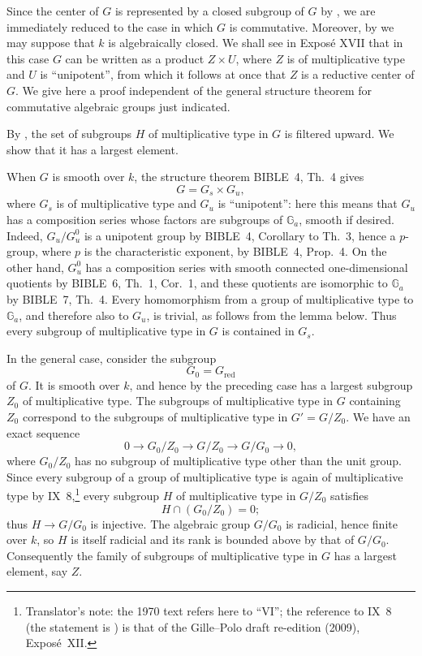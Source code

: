 Since the center of \(G\) is represented by a closed subgroup of
\(G\) by , we are immediately reduced to the case in which
\(G\) is commutative. Moreover, by  we may suppose that \(k\) is
algebraically closed. We shall see in Exposé XVII that in this case
\(G\) can be written as a product \(Z\times U\), where \(Z\) is of
multiplicative type and \(U\) is ``unipotent'', from which it follows
at once that \(Z\) is a reductive center of \(G\). We give here a
proof independent of the general structure theorem for commutative
algebraic groups just indicated.

By , the set of subgroups \(H\) of multiplicative type in
\(G\) is filtered upward. We show that it has a largest element.

When \(G\) is smooth over \(k\), the structure theorem
BIBLE~4, Th.~4 gives
\[
  G=G_s\times G_u,
\]
where \(G_s\) is of multiplicative type and \(G_u\) is ``unipotent'':
here this means that \(G_u\) has a composition series whose factors
are subgroups of \(\mathbb G_a\), smooth if desired. Indeed,
\(G_u/G_u^0\) is a unipotent group by BIBLE~4, Corollary to Th.~3,
hence a \(p\)-group, where \(p\) is the characteristic exponent, by
BIBLE~4, Prop.~4. On the other hand, \(G_u^0\) has a composition
series with smooth connected one-dimensional quotients by BIBLE~6,
Th.~1, Cor.~1, and these quotients are isomorphic to \(\mathbb G_a\)
by BIBLE~7, Th.~4. Every homomorphism from a group of multiplicative
type to \(\mathbb G_a\), and therefore also to \(G_u\), is trivial,
as follows from the lemma below. Thus every subgroup of
multiplicative type in \(G\) is contained in \(G_s\).

In the general case, consider the subgroup
\[
  G_0=G_{\mathrm{red}}
\]
of \(G\). It is smooth over \(k\), and hence by the preceding case
has a largest subgroup \(Z_0\) of multiplicative type. The subgroups
of multiplicative type in \(G\) containing \(Z_0\) correspond to
the subgroups of multiplicative type in \(G'=G/Z_0\). We have an
exact sequence
\[
  0\longrightarrow G_0/Z_0
   \longrightarrow G/Z_0
   \longrightarrow G/G_0
   \longrightarrow 0,
\]
where \(G_0/Z_0\) has no subgroup of multiplicative type other than
the unit group. Since every subgroup of a group of multiplicative
type is again of multiplicative type by IX~8,\footnote{Translator's
note: the 1970 text refers here to ``VI''; the reference to IX~8 (the
statement is ) is that of the Gille--Polo draft
re-edition (2009), Exposé~XII.} every subgroup \(H\)
of multiplicative type in \(G/Z_0\) satisfies
\[
  H\cap(G_0/Z_0)=0;
\]
thus \(H\to G/G_0\) is injective. The algebraic group \(G/G_0\) is
radicial, hence finite over \(k\), so \(H\) is itself radicial and
its rank is bounded above by that of \(G/G_0\). Consequently the
family of subgroups of multiplicative type in \(G\) has a largest
element, say \(Z\).

